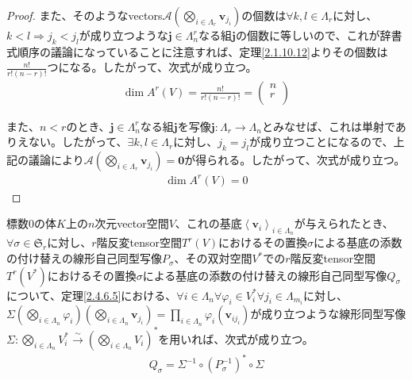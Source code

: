 \documentclass[dvipdfmx]{jsarticle}
\begin{document}
\begin{proof}
また、そのようなvectors$\mathcal{A}\left( \bigotimes_{i \in \varLambda_{r}} \mathbf{v}_{j_{i}} \right)$の個数は$\forall k,l \in \varLambda_{r}$に対し、$k < l \Rightarrow j_{k} < j_{l}$が成り立つような$\mathbf{j} \in \varLambda_{n}^{r}$なる組$\mathbf{j}$の個数に等しいので、これが辞書式順序の議論になっていることに注意すれば、定理\ref{2.1.10.12}よりその個数は$\frac{n!}{r!(n - r)!}$つになる。したがって、次式が成り立つ。
\begin{align*}
\dim{A^{r}(V)} = \frac{n!}{r!(n - r)!} = \begin{pmatrix}
n \\
r \\
\end{pmatrix}
\end{align*}\par
また、$n < r$のとき、$\mathbf{j} \in \varLambda_{n}^{r}$なる組$\mathbf{j}$を写像$\mathbf{j}:\varLambda_{r} \rightarrow \varLambda_{n}$とみなせば、これは単射でありえない。したがって、$\exists k,l \in \varLambda_{r}$に対し、$j_{k} = j_{l}$が成り立つことになるので、上記の議論により$\mathcal{A}\left( \bigotimes_{i \in \varLambda_{r}} \mathbf{v}_{j_{i}} \right) = \mathbf{0}$が得られる。したがって、次式が成り立つ。
\begin{align*}
\dim{A^{r}(V)} = 0
\end{align*}
\end{proof}
\begin{thm}\label{2.4.8.16}
標数$0$の体$K$上の$n$次元vector空間$V$、これの基底$\left\langle \mathbf{v}_{i} \right\rangle_{i \in \varLambda_{n}}$が与えられたとき、$\forall\sigma \in \mathfrak{S}_{r}$に対し、$r$階反変tensor空間$T^{r}(V)$におけるその置換$\sigma$による基底の添数の付け替えの線形自己同型写像$P_{\sigma}$、その双対空間$V^{*}$での$r$階反変tensor空間$T^{r}(V^{*})$におけるその置換$\sigma$による基底の添数の付け替えの線形自己同型写像$Q_{\sigma}$について、定理\ref{2.4.6.5}における、$\forall i \in \varLambda_{n}\forall\varphi_{i} \in V_{i}^{*}\forall j_{i} \in \varLambda_{m_{i}}$に対し、$\varSigma\left( \bigotimes_{i \in \varLambda_{n}} \varphi_{i} \right)\left( \bigotimes_{i \in \varLambda_{n}} \mathbf{v}_{j_{i}} \right) = \prod_{i \in \varLambda_{n}} {\varphi_{i}\left( \mathbf{v}_{ij_{i}} \right)}$が成り立つような線形同型写像$\varSigma:\bigotimes_{i \in \varLambda_{n}} V_{i}^{*}\overset{\sim}{\rightarrow}\left( \bigotimes_{i \in \varLambda_{n}} V_{i} \right)^{*}$を用いれば、次式が成り立つ。
\begin{align*}
Q_{\sigma} = \varSigma^{- 1} \circ \left( P_{\sigma}^{- 1} \right)^{*} \circ \varSigma
\end{align*}
\end{thm}
\end{document}
